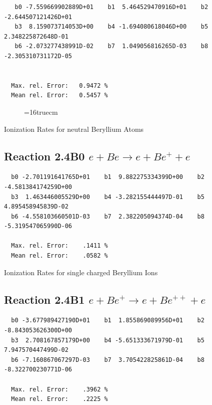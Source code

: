 \documentclass[12pt,dvips]{article}
\begin{document}
\begin{small}\begin{verbatim}
   b0 -7.559669902889D+01    b1  5.464529470916D+01    b2 -2.644507121426D+01
   b3  8.159073714053D+00    b4 -1.694080618046D+00    b5  2.348225872648D-01
   b6 -2.073277438991D-02    b7  1.049056816265D-03    b8 -2.305310731172D-05


  Max. rel. Error:   0.9472 %
  Mean rel. Error:   0.5457 %

\end{verbatim}\end{small}

\begin{figure} \label{2.2B}
\epsfxsize=16truecm
\end{figure}
\newpage

 Ionization Rates for neutral Beryllium Atoms

\subsection{
Reaction 2.4B0   $e + Be \rightarrow e + Be^+ + e $
}

\begin{small}\begin{verbatim}
  b0 -2.701191641765D+01    b1  9.882275334399D+00    b2 -4.581384174259D+00
  b3  1.463446005529D+00    b4 -3.282155444497D-01    b5  4.895458945839D-02
  b6 -4.558103660501D-03    b7  2.382205094374D-04    b8 -5.319547065990D-06

  Max. rel. Error:    .1411 %
  Mean rel. Error:    .0582 %

\end{verbatim}\end{small}

 Ionization Rates for
 single charged Beryllium Ions

\subsection{
Reaction 2.4B1  $e + Be^+ \rightarrow e + Be^{++} + e $
}


\begin{small}\begin{verbatim}
  b0 -3.677989427190D+01    b1  1.855869089956D+01    b2 -8.843053626300D+00
  b3  2.708167857179D+00    b4 -5.651333671979D-01    b5  7.947570447499D-02
  b6 -7.160867067297D-03    b7  3.705422825861D-04    b8 -8.322700230771D-06

  Max. rel. Error:    .3962 %
  Mean rel. Error:    .2225 %

\end{verbatim}\end{small}
\end{document}
